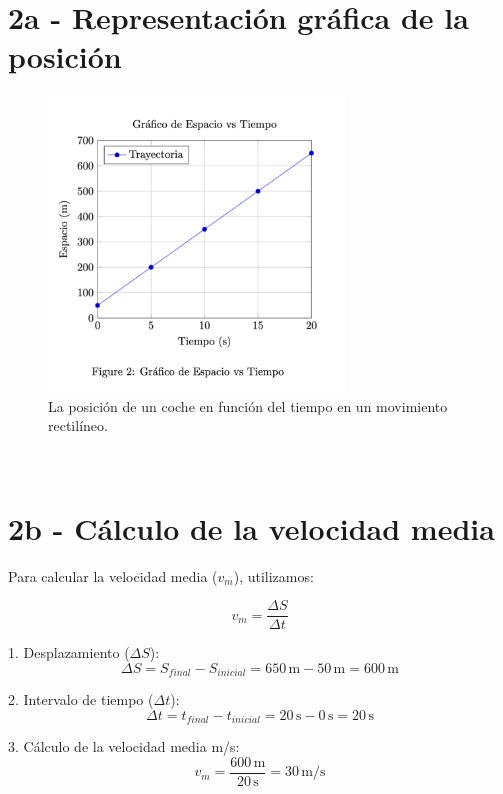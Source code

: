 \documentclass{article}
\begin{document}
\section*{2a - Representación gráfica de la posición}

\begin{figure}[H] %
    \centering
    \includegraphics[width=0.7\textwidth]{grafico.png} %
    \caption{La posición de un coche en función del tiempo en un movimiento rectilíneo.
    }
    \label{fig:grafico}
\end{figure}\



\section*{2b - Cálculo de la velocidad media}

Para calcular la velocidad media (\(v_m\)), utilizamos:

\[
v_m = \frac{\Delta S}{\Delta t}
\]

1. Desplazamiento (\(\Delta S\)):
   \[
   \Delta S = S_{final} - S_{inicial} = 650 \, \text{m} - 50 \, \text{m} = 600 \, \text{m}
   \]

2. Intervalo de tiempo (\(\Delta t\)):
   \[
   \Delta t = t_{final} - t_{inicial} = 20 \, \text{s} - 0 \, \text{s} = 20 \, \text{s}
   \]

3. Cálculo de la velocidad media m/s:
\[
v_m = \frac{600 \, \text{m}}{20 \, \text{s}} = \boxed{30 \, \text{m/s}}
\]
\end{document}
